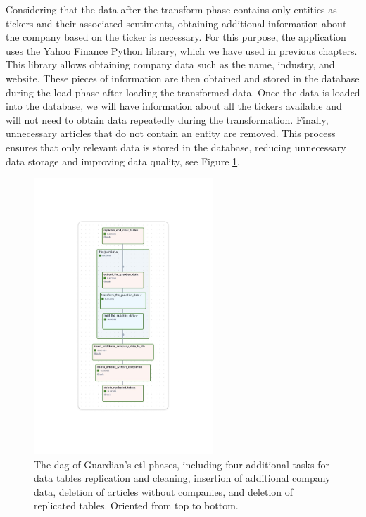 Considering that the data after the transform phase contains only entities as tickers and their associated sentiments, obtaining additional information about the company based on the ticker is necessary. For this purpose, the application uses the Yahoo Finance Python library, which we have used in previous chapters. This library allows obtaining company data such as the name, industry, and website. These pieces of information are then obtained and stored in the database during the load phase after loading the transformed data. Once the data is loaded into the database, we will have information about all the tickers available and will not need to obtain data repeatedly during the transformation. Finally, unnecessary articles that do not contain an entity are removed. This process ensures that only relevant data is stored in the database, reducing unnecessary data storage and improving data quality, see Figure \ref{fig:architecture-etl-highest}.
\begin{figure}[htbp]
    \centering
    \includegraphics[width=0.6\textwidth]{img/architecture/etl-highest.pdf}
    \caption{The \acrshort{dag} of Guardian's \acrshort{etl} phases, including four additional tasks for data tables replication and cleaning, insertion of additional company data, deletion of articles without companies, and deletion of replicated tables. Oriented from top to bottom.}
    \label{fig:architecture-etl-highest}
\end{figure}

